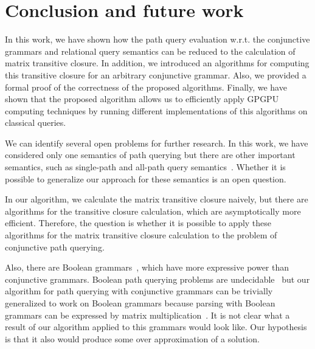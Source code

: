 \section{Conclusion and future work} \label{section_conclusion}
In this work, we have shown how the path query evaluation w.r.t. the conjunctive grammars and relational query semantics can be reduced to the calculation of matrix transitive closure. In addition, we introduced an algorithms for computing this transitive closure for an arbitrary conjunctive grammar. Also, we provided a formal proof of the correctness of the proposed algorithms. Finally, we have shown that the proposed algorithm allows us to efficiently apply GPGPU computing techniques by running different implementations of this algorithms on classical queries. 

We can identify several open problems for further research. In this work, we have considered only one semantics of path querying but there are other important semantics, such as single-path and all-path query semantics~\cite{hellingsPathQuerying}. Whether it is possible to generalize our approach for these semantics is an open question.

In our algorithm, we calculate the matrix transitive closure naively, but there are algorithms for the transitive closure calculation, which are asymptotically more efficient. Therefore, the question is whether it is possible to apply these algorithms for the matrix transitive closure calculation to the problem of conjunctive path querying.

Also, there are Boolean grammars~\cite{okhotinBoolean}, which have more expressive power than conjunctive grammars. Boolean path querying problems are undecidable~\cite{hellingsRelational} but our algorithm for path querying with conjunctive grammars can be trivially generalized to work on Boolean grammars because parsing with Boolean grammars can be expressed by matrix multiplication~\cite{okhotin_cyk}. It is not clear what a result of our algorithm applied to this grammars would look like. Our hypothesis is that it also would produce some over approximation of a solution.
